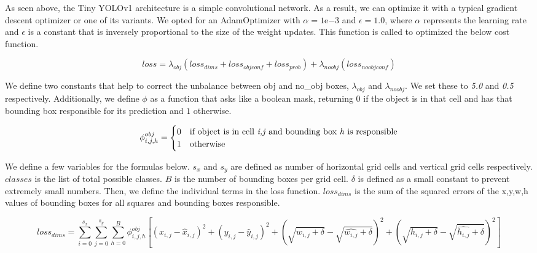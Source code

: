 \documentclass{article}
\begin{document}
As seen above, the Tiny YOLOv1 architecture is a simple convolutional network. As a result, we can optimize it with a typical gradient descent optimizer or one of its variants. We opted for an AdamOptimizer with $\alpha = 1\mathrm{e}{-3}$ and $\epsilon = 1.0$, where $\alpha$ represents the learning rate and $\epsilon$ is a constant that is inversely proportional to the size of the weight updates. This function is called to optimized the below cost function.

\begin{equation}
loss = \lambda_{obj}(loss_{dims} + loss_{objconf}  + loss_{prob}) + \lambda_{noobj}(loss_{noobjconf})
\end{equation}

We define two constants that help to correct the unbalance between obj and no\_obj boxes, $\lambda_{obj}$ and $\lambda_{noobj}$. We set these to \textit{5.0} and \textit{0.5} respectively. Additionally, we define $\phi$ as a function that asks like a boolean mask, returning $0$ if the object is in that cell and has that bounding box responsible for its prediction and $1$ otherwise.

\begin{equation}
\phi_{i,j,h}^{obj} =
\begin{cases}
0 & \text{if object is in cell \textit{i,j} and bounding box \textit{h} is responsible} \\
1 & \text{otherwise}
\end{cases}
\end{equation}

We define a few variables for the formulas below. $s_x$ and $s_y$ are defined as number of horizontal grid cells and vertical grid cells respectively. $classes$ is the list of total possible classes. $B$ is the number of bounding boxes per grid cell. $\delta$ is defined as a small constant to prevent extremely small numbers. Then, we define the individual terms in the loss function. $loss_{dims}$ is the sum of the squared errors of the x,y,w,h values of bounding boxes for all squares and bounding boxes responsible.

\begin{equation}
loss_{dims} = \sum\limits_{i=0}^{s_x}\sum\limits_{j=0}^{s_y}\sum\limits_{h=0}^{B}\phi_{i,j,h}^{obj}[(x_{i,j} - \hat{x}_{i,j})^2 + (y_{i,j} - \hat{y}_{i,j})^2 + (\sqrt{w_{i,j} + \delta} - \sqrt{\hat{w_{i,j}} + \delta})^2 + (\sqrt{h_{i,j} + \delta} - \sqrt{\hat{h_{i,j}} + \delta})^2]
\end{equation}
\end{document}
